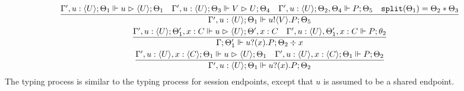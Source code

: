 \begin{gather*}
\frac{\Gamma' , u : \langle U \rangle ; \Theta_1 \Vdash u \vartriangleright \langle U \rangle ; \Theta_1 \quad \Gamma' , u : \langle U \rangle ; \Theta_3 \Vdash V \vartriangleright U ; \Theta_4 \quad \Gamma', u : \langle U \rangle ; \Theta_2, \Theta_4 \Vdash P ; \Theta_5 \quad \texttt{split}(\Theta_1) = \Theta_2 * \Theta_3}{\Gamma', u : \langle U \rangle ; \Theta_1 \Vdash u ! \langle V \rangle . P ; \Theta_5} \\
\frac{\Gamma' , u : \langle U \rangle ; \Theta_1', x : C \Vdash u \vartriangleright \langle U \rangle ; \Theta' , x : C \quad \Gamma' , u : \langle U \rangle , \Theta_1', x : C \Vdash P ; \theta_2}{\Gamma ; \Theta_1' \Vdash u ? (x) . P ; \Theta_2 \div x} \\
\frac{\Gamma' , u : \langle U \rangle , x : \langle C \rangle ; \Theta_1 \Vdash u \vartriangleright \langle U \rangle ; \Theta_1 \quad \Gamma' , u : \langle U \rangle , x : \langle C \rangle ; \Theta_1 \Vdash P ; \Theta_2}{\Gamma', u : \langle U \rangle ; \Theta_1 \Vdash u ? (x) . P ; \Theta_2} \\
\end{gather*}
The typing process is similar to the typing process for session endpoints, except that $u$ is assumed to be a shared endpoint.

